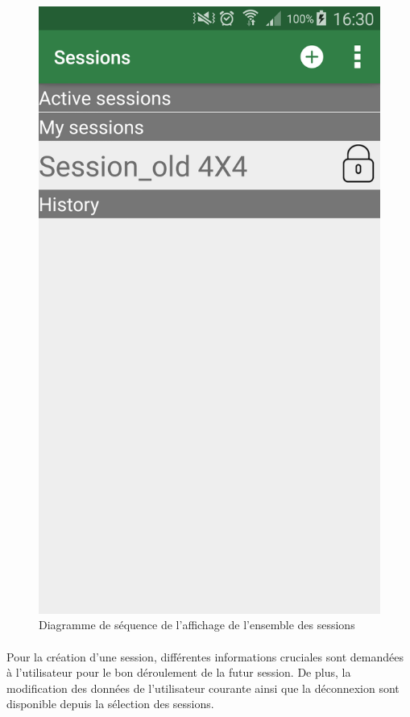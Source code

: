 \documentclass[titlepage, 12pt]{report}
\begin{document}
\begin{figure}[!h]
	\caption{Diagramme de séquence de l'affichage de l'ensemble des sessions}
	\label{screenshots_list_session}
	\centering
	\includegraphics[scale=0.2]{Images/screenshots/list_sessions.png}
\end{figure}

\clearpage


\paragraph{}Pour la création d'une session, différentes informations cruciales sont demandées à l'utilisateur pour le bon déroulement de la futur session.
De plus, la modification des données de l'utilisateur courante ainsi que la déconnexion sont disponible depuis la sélection des sessions.
\end{document}
